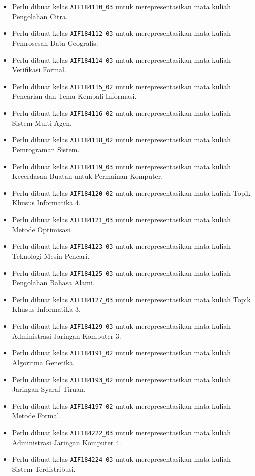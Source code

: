 \begin{enumerate}
\begin{itemize}
		\item Perlu dibuat kelas \texttt{AIF184110\_03} untuk merepresentasikan mata kuliah Pengolahan Citra.
		\item Perlu dibuat kelas \texttt{AIF184112\_03} untuk merepresentasikan mata kuliah Pemrosesan Data Geografis.
		\item Perlu dibuat kelas \texttt{AIF184114\_03} untuk merepresentasikan mata kuliah Verifikasi Formal.
		\item Perlu dibuat kelas \texttt{AIF184115\_02} untuk merepresentasikan mata kuliah Pencarian dan Temu Kembali Informasi.
		\item Perlu dibuat kelas \texttt{AIF184116\_02} untuk merepresentasikan mata kuliah Sistem Multi Agen.
		\item Perlu dibuat kelas \texttt{AIF184118\_02} untuk merepresentasikan mata kuliah Pemrograman Sistem.
		\item Perlu dibuat kelas \texttt{AIF184119\_03} untuk merepresentasikan mata kuliah Kecerdasan Buatan untuk Permainan Komputer.
		\item Perlu dibuat kelas \texttt{AIF184120\_02} untuk merepresentasikan mata kuliah Topik Khusus Informatika 4.
		\item Perlu dibuat kelas \texttt{AIF184121\_03} untuk merepresentasikan mata kuliah Metode Optimisasi.
		\item Perlu dibuat kelas \texttt{AIF184123\_03} untuk merepresentasikan mata kuliah Teknologi Mesin Pencari.
		\item Perlu dibuat kelas \texttt{AIF184125\_03} untuk merepresentasikan mata kuliah Pengolahan Bahasa Alami.
		\item Perlu dibuat kelas \texttt{AIF184127\_03} untuk merepresentasikan mata kuliah Topik Khusus Informatika 3.
		\item Perlu dibuat kelas \texttt{AIF184129\_03} untuk merepresentasikan mata kuliah Administrasi Jaringan Komputer 3.
		\item Perlu dibuat kelas \texttt{AIF184191\_02} untuk merepresentasikan mata kuliah Algoritma Genetika.
		\item Perlu dibuat kelas \texttt{AIF184193\_02} untuk merepresentasikan mata kuliah Jaringan Syaraf Tiruan.
		\item Perlu dibuat kelas \texttt{AIF184197\_02} untuk merepresentasikan mata kuliah Metode Formal.
		\item Perlu dibuat kelas \texttt{AIF184222\_03} untuk merepresentasikan mata kuliah Administrasi Jaringan Komputer 4.
		\item Perlu dibuat kelas \texttt{AIF184224\_03} untuk merepresentasikan mata kuliah Sistem Terdistribusi.

\end{itemize}
\end{enumerate}
